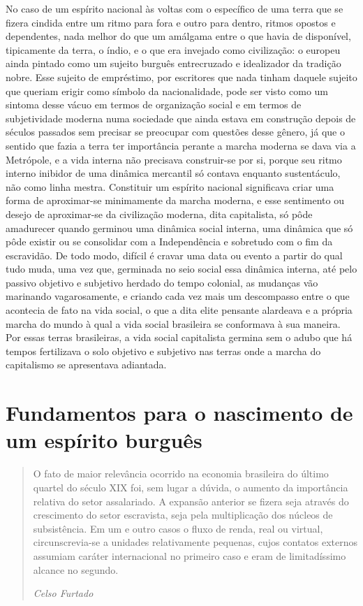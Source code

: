 No caso de um espírito nacional às voltas com o específico de uma terra
que se fizera cindida entre um ritmo para fora e outro para dentro,
ritmos opostos e dependentes, nada melhor do que um amálgama entre o que
havia de disponível, tipicamente da terra, o índio, e o que era invejado
como civilização: o europeu ainda pintado como um sujeito burguês
entrecruzado e idealizador da tradição nobre. Esse sujeito de
empréstimo, por escritores que nada tinham daquele sujeito que queriam
erigir como símbolo da nacionalidade, pode ser visto como um sintoma
desse vácuo em termos de organização social e em termos de subjetividade
moderna numa sociedade que ainda estava em construção depois de séculos
passados sem precisar se preocupar com questões desse gênero, já que o
sentido que fazia a terra ter importância perante a marcha moderna se
dava via a Metrópole, e a vida interna não precisava construir-se por
si, porque seu ritmo interno inibidor de uma dinâmica mercantil só
contava enquanto sustentáculo, não como linha mestra. Constituir um
espírito nacional significava criar uma forma de aproximar-se
minimamente da marcha moderna, e esse sentimento ou desejo de
aproximar-se da civilização moderna, dita capitalista, só pôde
amadurecer quando germinou uma dinâmica social interna, uma dinâmica que
só pôde existir ou se consolidar com a Independência e sobretudo com o
fim da escravidão. De todo modo, difícil é cravar uma data ou evento a
partir do qual tudo muda, uma vez que, germinada no seio social essa
dinâmica interna, até pelo passivo objetivo e subjetivo herdado do tempo
colonial, as mudanças vão marinando vagarosamente, e criando cada vez
mais um descompasso entre o que acontecia de fato na vida social, o que
a dita elite pensante alardeava e a própria marcha do mundo à qual a
vida social brasileira se conformava à sua maneira. Por essas terras
brasileiras, a vida social capitalista germina sem o adubo que há tempos
fertilizava o solo objetivo e subjetivo nas terras onde a marcha do
capitalismo se apresentava adiantada.

\section{Fundamentos para o nascimento de um espírito burguês}

\begin{quote}
O fato de maior relevância ocorrido na economia brasileira do último
quartel do século XIX foi, sem lugar a dúvida, o aumento da importância
relativa do setor assalariado. A expansão anterior se fizera seja
através do crescimento do setor escravista, seja pela multiplicação dos
núcleos de subsistência. Em um e outro casos o fluxo de renda, real ou
virtual, circunscrevia-se a unidades relativamente pequenas, cujos
contatos externos assumiam caráter internacional no primeiro caso e eram
de limitadíssimo alcance no segundo.

\emph{Celso Furtado}
\end{quote}

